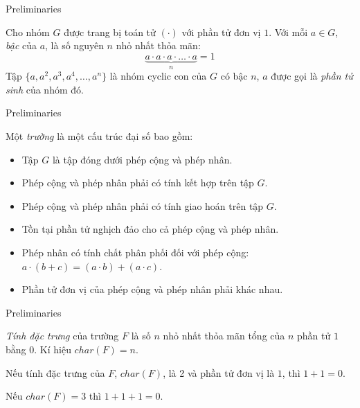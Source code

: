 \documentclass [xcolor=svgnames, t] {beamer}
\theoremstyle{definition}
\begin{document}
\begin{frame}{Preliminaries}
    \begin{definition}
        \label{define:2.2}
        Cho nhóm $G$ được trang bị toán tử $(\cdot)$ với phần tử đơn vị $1$. Với mỗi $a \in G$, \textit{bậc} của $a$, là số nguyên $n$ nhỏ nhất thỏa mãn:
        \begin{equation}
            \label{equation:2.1}
            \underbrace{a \cdot a \cdot a \cdot \ldots \cdot a}_{n} = 1
        \end{equation}
        Tập $\{a, a^2, a^3, a^4, \ldots, a^n\}$ là nhóm cyclic con của $G$ có bậc $n$, $a$ được gọi là \textit{phần tử sinh} của nhóm đó.
    \end{definition}
\end{frame}
\begin{frame}{Preliminaries}
    \begin{definition}
        \label{define:2.3}
        Một \textit{trường} là một cấu trúc đại số bao gồm:
        \begin{itemize}
            \item Tập $G$ là tập đóng dưới phép cộng và phép nhân.
            \item Phép cộng và phép nhân phải có tính kết hợp trên tập $G$.
            \item Phép cộng và phép nhân phải có tính giao hoán trên tập $G$.
            \item Tồn tại phần tử nghịch đảo cho cả phép cộng và phép nhân.
            \item Phép nhân có tính chất phân phối đối với phép cộng: $a \cdot (b + c) = (a \cdot b) + (a \cdot c)$.
            \item Phần tử đơn vị của phép cộng và phép nhân phải khác nhau.
        \end{itemize}
    \end{definition}
\end{frame}
\begin{frame}{Preliminaries}
    \begin{definition}
        \textit{Tính đặc trưng} của trường $F$ là số $n$ nhỏ nhất thỏa mãn tổng của $n$ phần tử $1$ bằng $0$. Kí hiệu $char(F) = n$.
    \end{definition}
    \begin{example}
        Nếu tính đặc trưng của $F$, $char(F)$, là 2 và phần tử đơn vị là $1$, thì $ 1 + 1 = 0 $.

        Nếu $char(F) = 3$ thì $ 1 + 1 + 1 = 0 $.
    \end{example}

\end{frame}
\end{document}
